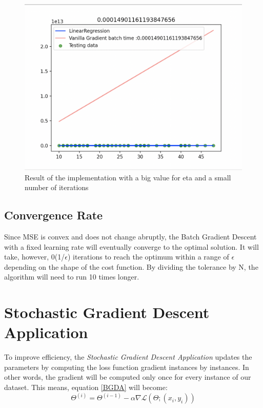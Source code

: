 \documentclass[conference]{IEEEtran}
\begin{document}
\begin{figure}[ht]
    \includegraphics[scale=0.35]{Fig3.png}
    \caption{Result of the implementation with a big value for eta and a small number of iterations}
    \label{fig:va_gr_ben_eta_big}
\end{figure}


\subsection{Convergence Rate}
Since MSE is convex and does not change abruptly, the
Batch Gradient Descent with a fixed learning rate will eventually converge to the optimal solution. It will take, however, 0(1/$\epsilon$) iterations to reach the  optimum within a range of $\epsilon$ depending on the shape of the cost function. By dividing the tolerance by N, the algorithm will need to run 10 times longer. \cite{Scikit-Learn}


\section{Stochastic Gradient Descent Application}


To improve efficiency, the \textit{Stochastic Gradient Descent Application} updates the parameters by computing the loss function gradient instances by instances. In other words, the gradient will be computed only once for every instance of our dataset. This means, equation \eqref{BGDA} will become:
\begin{equation}
    \Theta^{(i)} = \Theta^{(i-1)} - \alpha\nabla\mathscr{L}(\Theta;(x_i,y_i))\label{eq:SGDA}
\end{equation}
\end{document}
